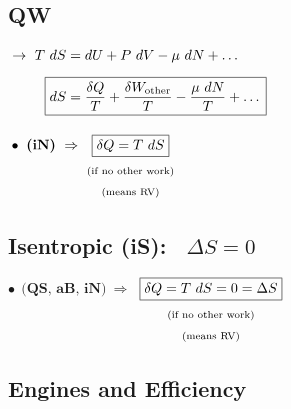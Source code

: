 \documentclass[12pt]{article}
\begin{document}
\vspace{20pt}
\noindent
\begin{minipage}[t]{.48\textwidth}
    \setlength{\parindent}{.5cm}

    \subsection{QW}
    \vspace{10pt}
    \(\begin{aligned}
        &\rightarrow \ \begin{aligned}[t]
            T\ dS &= dU + P\ dV - \mu\ dN + \dots\\[5pt]
            \Aboxed{ dS &= \frac{\delta Q}{T} + \frac{\delta W_\text{other}}{T} - \frac{\mu\ dN}{T} + \dots}
        \end{aligned}\\[10pt]
        &\bullet \ \textbf{(iN)} \ \Rightarrow \ \begin{gathered}[t]
            \boxed{ \delta Q = T\ dS }\\
            \text{\scriptsize(if no other work)}\\
            \text{\scriptsize(means RV)}
        \end{gathered}
    \end{aligned}\)    
\end{minipage}
\begin{minipage}[t]{.48\textwidth}
    \setlength{\parindent}{.5cm}

    \subsection{Isentropic (iS): \ \(\boxed{ \Delta S = 0 }\)}
    \vspace{10pt}
    \(\bullet \ \ \big( \textbf{QS, aB, iN} \big) \ \Rightarrow\ \)
    \(\begin{gathered}[t]
        \boxed{\delta Q = T\ dS = 0 = \Delta S}\\
        \text{\scriptsize(if no other work)}\\
        \text{\scriptsize(means RV)}
    \end{gathered}\)
\end{minipage}

\newpage
\subsection{Engines and Efficiency}
\end{document}
